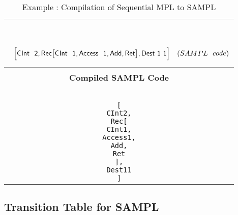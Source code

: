 \documentclass[11pt]{article}
\newcommand{\<}{\langle}
\renewcommand{\>}{\rangle}
\begin{document}
\begin{table}[!h]
\begin{center}
\begin{tabular}{|c|}
\begin{minipage}{6in}
{\begin{align*}
{  } & {} \\~~\\ 
& {
   \Big[{\sf CInt~~2},{\sf Rec}\big[{\sf CInt~~1},{\sf Access~~1,{\sf Add},{\sf Ret}}\big],{\sf Dest~1~1}\Big]
  } & {(SAMPL~~code)}   
\end{align*}
}
\end {minipage}\\ 
\hline 
{}\\
{\bf Compiled SAMPL Code} \\~~\\
\hline\hline 
\begin{minipage}{3in}
\begin{alltt}


[
  CInt 2,
  Rec [
        CInt 1,
        Access 1,
        Add,
        Ret
      ],
  Dest 1 1
]


\end{alltt}
\end{minipage}

\tabularnewline
\hline
\end{tabular}
\caption{Example : Compilation of Sequential MPL to SAMPL}
\label{AMPL:SEQMPLComp}
\end{center}
\end{table}

\subsection {Transition Table for SAMPL}
\end{document}
